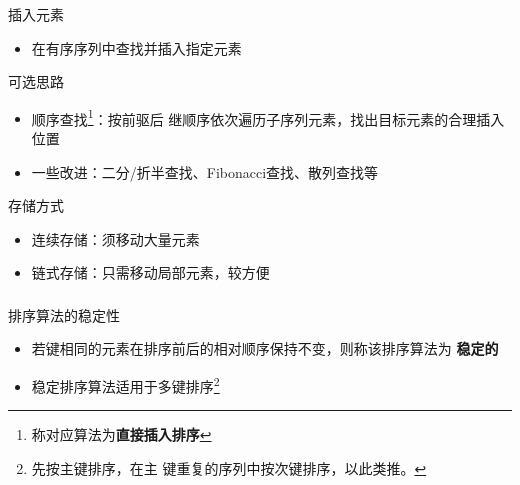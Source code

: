 \begin{frame}
    \frametitle{\insertsectionhead}
    \begin{block}{插入元素}
        \begin{itemize}
            \item 在\alert{有序序列}中\alert{查找}并\alert{插入}指定元素
        \end{itemize}
    \end{block}
    \begin{block}{可选思路}
        \begin{itemize}
            \item 顺序查找\footnote{称对应算法为\textbf{直接插入排序}}：按前驱后
                  继顺序依次遍历子序列元素，找出目标元素的合理插入位置
            \item 一些改进：二分/折半查找、Fibonacci查找、散列查找等
        \end{itemize}
    \end{block}
    \begin{block}{存储方式}
        \begin{itemize}
            \item 连续存储：须移动大量元素
            \item 链式存储：只需移动局部元素，较方便
        \end{itemize}
    \end{block}
\end{frame}

\begin{frame}
    \frametitle{\insertsectionhead}
    \begin{alertblock}{排序算法的稳定性}
        \begin{itemize}
            \item 若键相同的元素在排序前后的相对顺序保持不变，则称该排序算法为
                  \textbf{稳定的}
            \item 稳定排序算法适用于\alert{多键排序}\footnote{先按主键排序，在主
                      键重复的序列中按次键排序，以此类推。}
        \end{itemize}
    \end{alertblock}
\end{frame}

